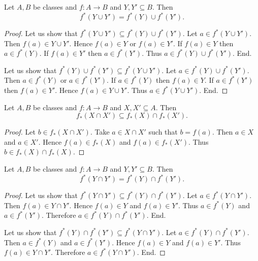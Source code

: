 \documentclass[../set-theory.tex]{subfiles}
\begin{document}
  \begin{forthel}
    \begin{proposition}
      Let $A, B$ be classes and $f : A \to B$ and $Y, Y' \subseteq B$.
      Then \[ f^{*}(Y \cup Y') = f^{*}(Y) \cup f^{*}(Y'). \]
    \end{proposition}
    \begin{proof}
      Let us show that $f^{*}(Y \cup Y') \subseteq f^{*}(Y) \cup f^{*}(Y')$.
        Let $a \in f^{*}(Y \cup Y')$.
        Then $f(a) \in Y \cup Y'$.
        Hence $f(a) \in Y$ or $f(a) \in Y'$.
        If $f(a) \in Y$ then $a \in f^{*}(Y)$.
        If $f(a) \in Y'$ then $a \in f^{*}(Y')$.
        Thus $a \in f^{*}(Y) \cup f^{*}(Y')$.
      End.

      Let us show that $f^{*}(Y) \cup f^{*}(Y') \subseteq f^{*}(Y \cup Y')$.
        Let $a \in f^{*}(Y) \cup f^{*}(Y')$.
        Then $a \in f^{*}(Y)$ or $a \in f^{*}(Y')$.
        If $a \in f^{*}(Y)$ then $f(a) \in Y$.
        If $a \in f^{*}(Y')$ then $f(a) \in Y'$.
        Hence $f(a) \in Y \cup Y'$.
        Thus $a \in f^{*}(Y \cup Y')$.
      End.
    \end{proof}
  \end{forthel}

  \begin{forthel}
    \begin{proposition}
      Let $A, B$ be classes and $f : A \to B$ and $X, X' \subseteq A$.
      Then \[ f_{*}(X \cap X') \subseteq f_{*}(X) \cap f_{*}(X'). \]
    \end{proposition}
    \begin{proof}
      Let $b \in f_{*}(X \cap X')$.
      Take $a \in X \cap X'$ such that $b = f(a)$.
      Then $a \in X$ and $a \in X'$.
      Hence $f(a) \in f_{*}(X)$ and $f(a) \in f_{*}(X')$.
      Thus $b \in f_{*}(X) \cap f_{*}(X)$.
    \end{proof}
  \end{forthel}

  \begin{forthel}
    \begin{proposition}
      Let $A, B$ be classes and $f : A \to B$ and $Y, Y' \subseteq B$.
      Then \[ f^{*}(Y \cap Y') = f^{*}(Y) \cap f^{*}(Y'). \]
    \end{proposition}
    \begin{proof}
      Let us show that $f^{*}(Y \cap Y') \subseteq f^{*}(Y) \cap f^{*}(Y')$.
        Let $a \in f^{*}(Y \cap Y')$.
        Then $f(a) \in Y \cap Y'$.
        Hence $f(a) \in Y$ and $f(a) \in Y'$.
        Thus $a \in f^{*}(Y)$ and $a \in f^{*}(Y')$.
        Therefore $a \in f^{*}(Y) \cap f^{*}(Y')$.
      End.

      Let us show that $f^{*}(Y) \cap f^{*}(Y') \subseteq f^{*}(Y \cap Y')$.
        Let $a \in f^{*}(Y) \cap f^{*}(Y')$.
        Then $a \in f^{*}(Y)$ and $a \in f^{*}(Y')$.
        Hence $f(a) \in Y$ and $f(a) \in Y'$.
        Thus $f(a) \in Y \cap Y'$.
        Therefore $a \in f^{*}(Y \cap Y')$.
      End.
    \end{proof}
  \end{forthel}
\end{document}

